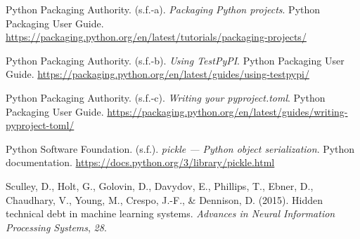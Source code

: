 \documentclass[12pt,a4paper]{article}
\newenvironment{referencias}
  {\begin{list}{}{%
     \setlength{\leftmargin}{1.6em}\setlength{\itemindent}{-1.6em}%
     \setlength{\labelwidth}{0pt}\setlength{\labelsep}{0pt}%
     \setlength{\itemsep}{0.7em}\setlength{\parsep}{0pt}}}
  {\end{list}}
\begin{document}
\begin{referencias}

\item Python Packaging Authority. (s.f.-a). \emph{Packaging Python projects}. Python Packaging
User Guide. \url{https://packaging.python.org/en/latest/tutorials/packaging-projects/}

\item Python Packaging Authority. (s.f.-b). \emph{Using TestPyPI}. Python Packaging User Guide.
\url{https://packaging.python.org/en/latest/guides/using-testpypi/}

\item Python Packaging Authority. (s.f.-c). \emph{Writing your pyproject.toml}. Python Packaging
User Guide. \url{https://packaging.python.org/en/latest/guides/writing-pyproject-toml/}

\item Python Software Foundation. (s.f.). \emph{pickle — Python object serialization}. Python
documentation. \url{https://docs.python.org/3/library/pickle.html}

\item Sculley, D., Holt, G., Golovin, D., Davydov, E., Phillips, T., Ebner, D., Chaudhary, V.,
Young, M., Crespo, J.-F., \& Dennison, D. (2015). Hidden technical debt in machine learning
systems. \emph{Advances in Neural Information Processing Systems}, \emph{28}.

\end{referencias}
\end{document}
